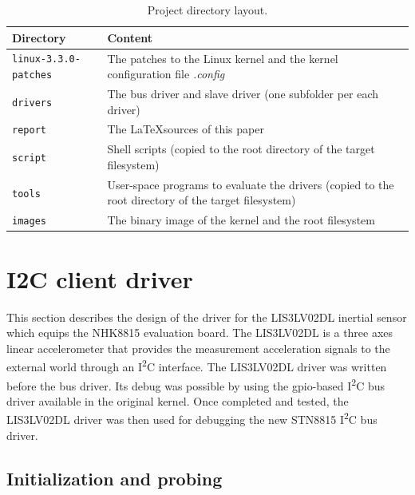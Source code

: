 \documentclass[a4paper,10pt]{article}
\newcommand{\icc}{I\textsuperscript{2}C }
\begin{document}
\begin{multicols}{2}
\begin{table}
	\centering
	\renewcommand{\arraystretch}{1.2}	
	\begin{tabular}{p{5cm} p{11cm}}
		\hline
		Directory & Content \\
		\hline
		\texttt{linux-3.3.0-patches} & The patches to the Linux kernel and the 
			kernel configuration file \emph{.config}\\
		\texttt{drivers} & The bus driver and slave driver (one subfolder per
			each driver) \\
		\texttt{report} & The \LaTeX sources of this paper \\
		\texttt{script} & Shell scripts (copied to the root directory of the
			target filesystem) \\
		\texttt{tools} & User-space programs to evaluate the drivers (copied to
			the root directory of the target filesystem) \\
		\texttt{images} & The binary image of the kernel and the root
			filesystem \\
		\hline
	\end{tabular}
	\caption{Project directory layout.}
	\label{table:project-dir-layout}
\end{table}




\section{I2C client driver}
\label{sec:i2c_client_driver}

This section describes the design of the driver for the LIS3LV02DL inertial
sensor which equips the NHK8815 evaluation board.
The LIS3LV02DL is a three axes linear accelerometer that provides the measurement acceleration signals to the external world through an \icc interface.
The LIS3LV02DL driver was written before the bus driver. Its debug was possible
by using the gpio-based \icc bus driver available in the original kernel. Once
completed and tested, the LIS3LV02DL driver was then used for debugging the new
STN8815 \icc bus driver.\\



\subsection{Initialization and probing}
\label{sec:lis3_init_probe}


\end{multicols}
\end{document}
